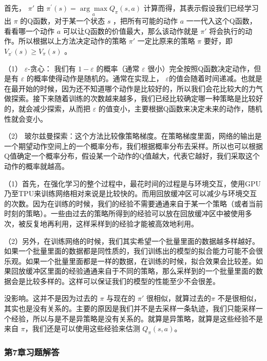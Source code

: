 
首先， $\pi'$ 由 $\pi^{\prime}(s)=\underset{a}{\arg \max} Q_{\pi}(s, a)$ 计算而得，其表示假设我们已经学习出 $\pi$ 的Q函数，对于某一个状态 $s$ ，把所有可能的动作 $a$ 一一代入这个Q函数，看看哪一个动作 $a$ 可以让Q函数的价值最大，那么该动作就是 $\pi'$ 将会执行的动作。所以根据以上方法决定动作的策略 $\pi'$ 一定比原来的策略 $\pi$ 要好，即 $V_{\pi^{\prime}}(s) \geqslant V_{\pi}(s)$ 。


（1） $\varepsilon$-贪心： 我们有 $1-\varepsilon$ 的概率（通常 $\varepsilon$ 很小）完全按照Q函数决定动作，但是有 $\varepsilon$ 的概率使得动作是随机的。通常在实现上， $\varepsilon$的值会随着时间递减。也就是在最开始的时候，因为还不知道哪个动作是比较好的，所以我们会花比较大的力气做探索。接下来随着训练的次数越来越多，我们已经比较确定哪一种策略是比较好的，就会减少探索，从而把 $\varepsilon$ 的值变小，主要根据Q函数来决定未来的动作，随机性就会变小。

（2） 玻尔兹曼探索：这个方法比较像策略梯度。在策略梯度里面，网络的输出是一个期望动作空间上的一个概率分布，我们根据概率分布去采样。所以也可以根据Q值确定一个概率分布，假设某一个动作的Q值越大，代表它越好，我们采取这个动作的概率就越高。


（1）首先，在强化学习的整个过程中，最花时间的过程是与环境交互，使用GPU乃至TPU来训练网络相对来说是比较快的。而用回放缓冲区可以减少与环境交互的次数。因为在训练的时候，我们的经验不需要通通来自于某一个策略（或者当前时刻的策略）。一些由过去的策略所得到的经验可以放在回放缓冲区中被使用多次，被反复地再利用，这样采样到的经验才能被高效地利用。

（2）另外，在训练网络的时候，我们其实希望一个批量里面的数据越多样越好。如果一个批量里面的数据都是同性质的，我们训练出的模型的拟合能力可能不会很乐观。如果一个批量里面都是一样的数据，在训练的时候，拟合效果会比较差。如果回放缓冲区里面的经验通通来自于不同的策略，那么采样到的一个批量里面的数据会是比较多样的。这样可以保证我们的模型的性能至少不会很差。


没影响。这并不是因为过去的 $\pi$ 与现在的 $\pi'$ 很相似，就算过去的$\pi$ 不是很相似，其实也是没有关系的。主要的原因是我们并不是去采样一条轨迹，我们只能采样一个经验，所以与是不是异策略是没有关系的。就算是异策略，就算是这些经验不是来自 $\pi$，我们还是可以使用这些经验来估测 $Q_{\pi}(s,a)$。


\subsubsection*{第7章习题解答}

